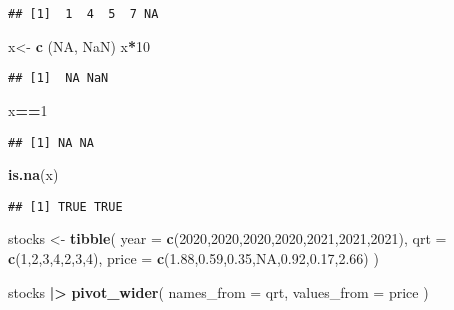 \documentclass[
]{article}
\newenvironment{Shaded}{\begin{snugshade}}{\end{snugshade}}
\newcommand{\AttributeTok}[1]{\textcolor[rgb]{0.13,0.29,0.53}{#1}}
\newcommand{\ConstantTok}[1]{\textcolor[rgb]{0.56,0.35,0.01}{#1}}
\newcommand{\DecValTok}[1]{\textcolor[rgb]{0.00,0.00,0.81}{#1}}
\newcommand{\FloatTok}[1]{\textcolor[rgb]{0.00,0.00,0.81}{#1}}
\newcommand{\FunctionTok}[1]{\textcolor[rgb]{0.13,0.29,0.53}{\textbf{#1}}}
\newcommand{\NormalTok}[1]{#1}
\newcommand{\OtherTok}[1]{\textcolor[rgb]{0.56,0.35,0.01}{#1}}
\newcommand{\SpecialCharTok}[1]{\textcolor[rgb]{0.81,0.36,0.00}{\textbf{#1}}}
\begin{document}
\begin{verbatim}
## [1]  1  4  5  7 NA
\end{verbatim}

\begin{Shaded}
\begin{Highlighting}[]
\NormalTok{x}\OtherTok{\textless{}{-}} \FunctionTok{c}\NormalTok{ (}\ConstantTok{NA}\NormalTok{, }\ConstantTok{NaN}\NormalTok{)}
\NormalTok{x}\SpecialCharTok{*}\DecValTok{10}
\end{Highlighting}
\end{Shaded}

\begin{verbatim}
## [1]  NA NaN
\end{verbatim}

\begin{Shaded}
\begin{Highlighting}[]
\NormalTok{x}\SpecialCharTok{==}\DecValTok{1}
\end{Highlighting}
\end{Shaded}

\begin{verbatim}
## [1] NA NA
\end{verbatim}

\begin{Shaded}
\begin{Highlighting}[]
\FunctionTok{is.na}\NormalTok{(x)}
\end{Highlighting}
\end{Shaded}

\begin{verbatim}
## [1] TRUE TRUE
\end{verbatim}

\begin{Shaded}
\begin{Highlighting}[]
\NormalTok{stocks }\OtherTok{\textless{}{-}} \FunctionTok{tibble}\NormalTok{(}
  \AttributeTok{year =} \FunctionTok{c}\NormalTok{(}\DecValTok{2020}\NormalTok{,}\DecValTok{2020}\NormalTok{,}\DecValTok{2020}\NormalTok{,}\DecValTok{2020}\NormalTok{,}\DecValTok{2021}\NormalTok{,}\DecValTok{2021}\NormalTok{,}\DecValTok{2021}\NormalTok{),}
  \AttributeTok{qrt =} \FunctionTok{c}\NormalTok{(}\DecValTok{1}\NormalTok{,}\DecValTok{2}\NormalTok{,}\DecValTok{3}\NormalTok{,}\DecValTok{4}\NormalTok{,}\DecValTok{2}\NormalTok{,}\DecValTok{3}\NormalTok{,}\DecValTok{4}\NormalTok{),}
  \AttributeTok{price =} \FunctionTok{c}\NormalTok{(}\FloatTok{1.88}\NormalTok{,}\FloatTok{0.59}\NormalTok{,}\FloatTok{0.35}\NormalTok{,}\ConstantTok{NA}\NormalTok{,}\FloatTok{0.92}\NormalTok{,}\FloatTok{0.17}\NormalTok{,}\FloatTok{2.66}\NormalTok{)}
\NormalTok{)}

\NormalTok{stocks }\SpecialCharTok{|\textgreater{}}
  \FunctionTok{pivot\_wider}\NormalTok{(}
    \AttributeTok{names\_from =}\NormalTok{ qrt,}
    \AttributeTok{values\_from =}\NormalTok{ price}
\NormalTok{  )}
\end{Highlighting}
\end{Shaded}
\end{document}

